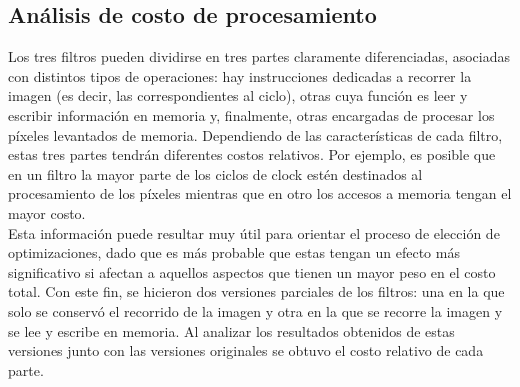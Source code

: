 \documentclass[a4paper]{article}
\begin{document}
\subsection{Análisis de costo de procesamiento}
Los tres filtros pueden dividirse en tres partes claramente diferenciadas, asociadas con distintos tipos de operaciones: hay instrucciones dedicadas a recorrer la imagen (es decir, las correspondientes al ciclo), otras cuya función es leer y escribir información en memoria y, finalmente, otras encargadas de procesar los píxeles levantados de memoria. Dependiendo de las características de cada filtro, estas tres partes tendrán diferentes costos relativos. Por ejemplo, es posible que en un filtro la mayor parte de los ciclos de clock estén destinados al procesamiento de los píxeles mientras que en otro los accesos a memoria tengan el mayor costo. \\
Esta información puede resultar muy útil para orientar el proceso de elección de optimizaciones, dado que es más probable que estas tengan un efecto más significativo si afectan a aquellos aspectos que tienen un mayor peso en el costo total. Con este fin, se hicieron dos versiones parciales de los filtros: una en la que solo se conservó el recorrido de la imagen y otra en la que se recorre la imagen y se lee y escribe en memoria. Al analizar los resultados obtenidos de estas versiones junto con las versiones originales se obtuvo el costo relativo de cada parte.
\end{document}
